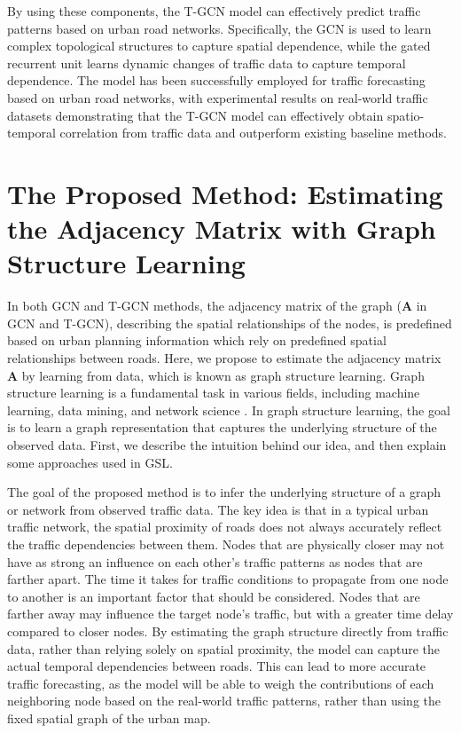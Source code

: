 \documentclass[pdflatex,sn-mathphys-num]{sn-jnl}%
\theoremstyle{thmstyleone}%
\theoremstyle{thmstyletwo}%
\theoremstyle{thmstylethree}%
\begin{document}
By using these components, the T-GCN model can effectively predict traffic patterns based on urban road networks. Specifically, the GCN is used to learn complex topological structures to capture spatial dependence, while the gated recurrent unit learns dynamic changes of traffic data to capture temporal dependence. The model has been successfully employed for traffic forecasting based on urban road networks, with experimental results on real-world traffic datasets demonstrating that the T-GCN model can effectively obtain spatio-temporal correlation from traffic data and outperform existing baseline methods.

\section{The Proposed Method: Estimating the Adjacency Matrix with Graph Structure Learning}\label{sec:proposedMethod}

In both GCN \citep{kipf2017semi} and T-GCN \citep{zhao2019t} methods, the adjacency matrix of the graph ($\mathbf{A}$ in GCN and T-GCN), describing the spatial relationships of the nodes, is predefined based on urban planning information  
 which rely on predefined spatial relationships between roads.
Here, we propose to estimate the adjacency matrix $\mathbf{A}$ by learning from data, which is known as graph structure learning. Graph structure learning is a fundamental task in various fields, including machine learning, data mining, and network science \citep{Chen2022}. In graph structure learning, the goal is to learn a graph representation that captures the underlying structure of the observed data.
First, we describe the intuition behind our idea, and then explain some approaches used in GSL.

The goal of the proposed method is to infer the underlying structure of a graph or network from observed traffic data. The key idea is that in a typical urban traffic network, the spatial proximity of roads does not always accurately reflect the traffic dependencies between them. Nodes that are physically closer may not have as strong an influence on each other's traffic patterns as nodes that are farther apart.
The time it takes for traffic conditions to propagate from one node to another is an important factor that should be considered. Nodes that are farther away may influence the target node's traffic, but with a greater time delay compared to closer nodes.
By estimating the graph structure directly from traffic data, rather than relying solely on spatial proximity, the model can capture the actual temporal dependencies between roads. This can lead to more accurate traffic forecasting, as the model will be able to weigh the contributions of each neighboring node based on the real-world traffic patterns, rather than using the fixed spatial graph of the urban map.
\end{document}

